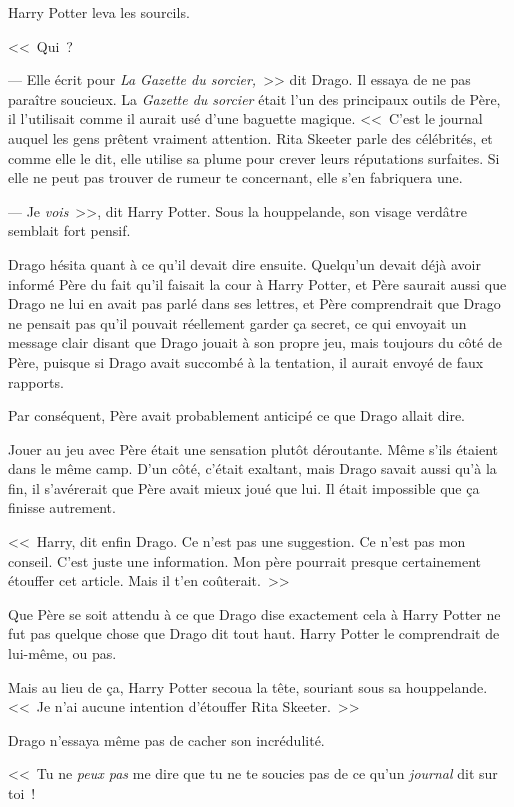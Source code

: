Harry Potter leva les sourcils.

<<~Qui~?

--- Elle écrit pour \emph{La Gazette du sorcier,}~>> dit Drago. Il essaya de ne pas paraître soucieux. La \emph{Gazette du sorcier} était l'un des principaux outils de Père, il l'utilisait comme il aurait usé d'une baguette magique. <<~C'est le journal auquel les gens prêtent vraiment attention. Rita Skeeter parle des célébrités, et comme elle le dit, elle utilise sa plume pour crever leurs réputations surfaites. Si elle ne peut pas trouver de rumeur te concernant, elle s'en fabriquera une.

--- Je \emph{vois}~>>, dit Harry Potter. Sous la houppelande, son visage verdâtre semblait fort pensif.

Drago hésita quant à ce qu'il devait dire ensuite. Quelqu'un devait déjà avoir informé Père du fait qu'il faisait la cour à Harry Potter, et Père saurait aussi que Drago ne lui en avait pas parlé dans ses lettres, et Père comprendrait que Drago ne pensait pas qu'il pouvait réellement garder ça secret, ce qui envoyait un message clair disant que Drago jouait à son propre jeu, mais toujours du côté de Père, puisque si Drago avait succombé à la tentation, il aurait envoyé de faux rapports.

Par conséquent, Père avait probablement anticipé ce que Drago allait dire.

Jouer au jeu avec Père était une sensation plutôt déroutante. Même s'ils étaient dans le même camp. D'un côté, c'était exaltant, mais Drago savait aussi qu'à la fin, il s'avérerait que Père avait mieux joué que lui. Il était impossible que ça finisse autrement.

<<~Harry, dit enfin Drago. Ce n'est pas une suggestion. Ce n'est pas mon conseil. C'est juste une information. Mon père pourrait presque certainement étouffer cet article. Mais il t'en coûterait.~>>

Que Père se soit attendu à ce que Drago dise exactement cela à Harry Potter ne fut pas quelque chose que Drago dit tout haut. Harry Potter le comprendrait de lui-même, ou pas.

Mais au lieu de ça, Harry Potter secoua la tête, souriant sous sa houppelande. <<~Je n'ai aucune intention d'étouffer Rita Skeeter.~>>

Drago n'essaya même pas de cacher son incrédulité.

<<~Tu ne \emph{peux pas} me dire que tu ne te soucies pas de ce qu'un \emph{journal} dit sur toi~!

